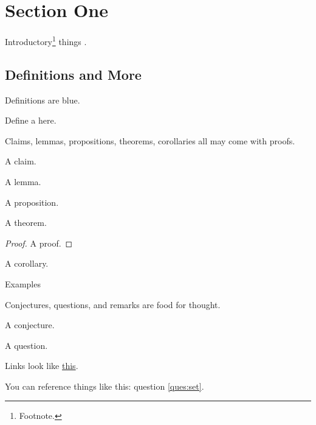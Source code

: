 \section{Section One}
\label{sets}

Introductory\footnote{Footnote.} things \cite{ireland1990classical}.

\subsection{Definitions and More}

Definitions are blue.
\begin{definition}
    Define a  here.
\end{definition}

Claims, lemmas, propositions, theorems, corollaries all may come with proofs.

\begin{claim}
    A claim.
\end{claim}

\begin{lemma}
    A lemma.
\end{lemma}

\begin{proposition}
    A proposition.
\end{proposition}

\begin{theorem}
    A theorem.
\end{theorem}

\begin{proof}
    A proof.
\end{proof}

\begin{corollary}
    A corollary.
\end{corollary}

\begin{example}
    Examples
\end{example}

Conjectures, questions, and remarks are food for thought.

\begin{conjecture}
    A conjecture.
\end{conjecture}

\begin{ques}
    \label{ques:set}
    A question.
\end{ques}

\begin{remark}
    Links look like \href{https://en.wikipedia.org/wiki/cantor%27s_diagonal_argument}{this}.
\end{remark}

You can reference things like this: question \ref{ques:set}.

